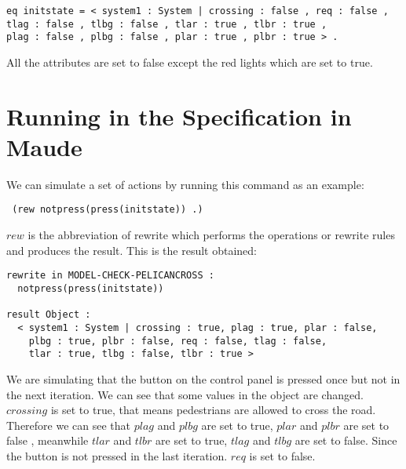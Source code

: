 \documentclass[a4paper,11pt]{report}
\begin{document}
\begin{verbatim}
eq initstate = < system1 : System | crossing : false , req : false , 
tlag : false , tlbg : false , tlar : true , tlbr : true , 
plag : false , plbg : false , plar : true , plbr : true > .
\end{verbatim}
All the attributes are set to false except the red lights which are set to true.
\section{Running in the Specification in Maude}
We can simulate a set of actions by running this command as an example:
\begin{verbatim} (rew notpress(press(initstate)) .)\end{verbatim}
$rew$ is the abbreviation of rewrite which performs the operations or rewrite rules and produces the result. This is the result obtained:
\begin{lstlisting}[frame=single,linewidth=15cm]
rewrite in MODEL-CHECK-PELICANCROSS :
  notpress(press(initstate))
	
result Object :
  < system1 : System | crossing : true, plag : true, plar : false,
    plbg : true, plbr : false, req : false, tlag : false,
    tlar : true, tlbg : false, tlbr : true >
\end{lstlisting}
\vspace{0.4cm}
We are simulating that the button on the control panel is pressed once but not in the next iteration.
We can see that some values in the object are changed. $crossing$ is set to true, that means pedestrians are allowed to cross the road. Therefore we can see that $plag$ and $plbg$ are set to true, $plar$ and $plbr$ are set to false , meanwhile $tlar$ and $tlbr$ are set to true, $tlag$ and $tlbg$ are set to false. Since the button is not pressed in the last iteration. $req$ is set to false. 
\end{document}
